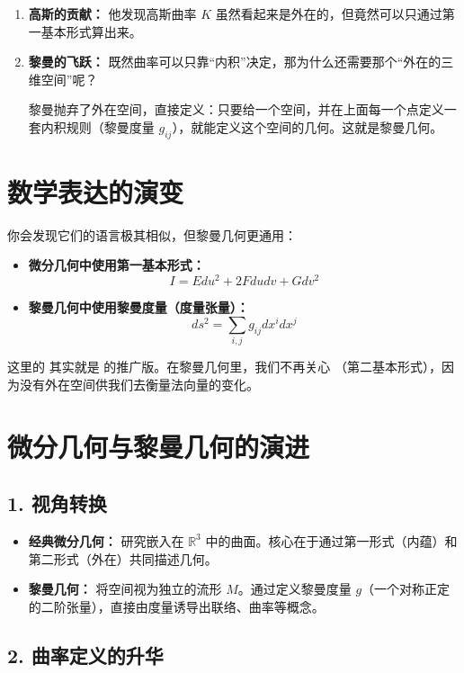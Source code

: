 \begin{enumerate}
\item \textbf{高斯的贡献：} 他发现高斯曲率 $K$ 虽然看起来是外在的，但竟然可以只通过第一基本形式算出来。

\item \textbf{黎曼的飞跃：} 既然曲率可以只靠“内积”决定，那为什么还需要那个“外在的三维空间”呢？

黎曼抛弃了外在空间，直接定义：只要给一个空间，并在上面每一个点定义一套内积规则（黎曼度量 $g_{ij}$），就能定义这个空间的几何。这就是黎曼几何。
\end{enumerate}

\section{数学表达的演变}

你会发现它们的语言极其相似，但黎曼几何更通用：

\begin{itemize}
\item \textbf{微分几何中使用第一基本形式：}
\[ I = E du^2 + 2F dudv + G dv^2 \]

\item \textbf{黎曼几何中使用黎曼度量（度量张量）：}
\[ ds^2 = \sum_{i,j} g_{ij} dx^i dx^j \]
\end{itemize}

这里的  其实就是  的推广版。在黎曼几何里，我们不再关心 （第二基本形式），因为没有外在空间供我们去衡量法向量的变化。

\section{微分几何与黎曼几何的演进}

\subsection*{1. 视角转换}

\begin{itemize}
\item \textbf{经典微分几何：} 研究嵌入在 $\mathbb{R}^3$ 中的曲面。核心在于通过第一形式（内蕴）和第二形式（外在）共同描述几何。

\item \textbf{黎曼几何：} 将空间视为独立的流形 $M$。通过定义黎曼度量 $g$（一个对称正定的二阶张量），直接由度量诱导出联络、曲率等概念。
\end{itemize}

\subsection*{2. 曲率定义的升华}

